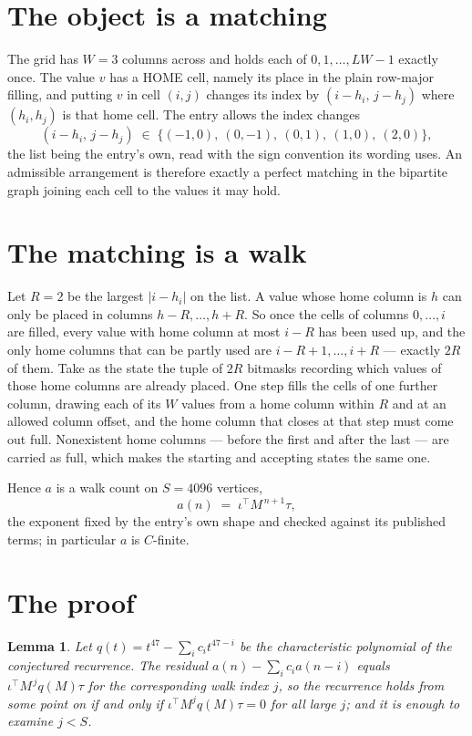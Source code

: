 \documentclass[11pt,a4paper]{article}
\theoremstyle{plain}
\newtheorem{lemma}[theorem]{Lemma}
\theoremstyle{definition}
\begin{document}
\section{The object is a matching}

The grid has $W=3$ columns across and holds each of $0,1,\dots,LW-1$ exactly once. The value
$v$ has a HOME cell, namely its place in the plain row-major filling, and putting $v$ in cell
$(i,j)$ changes its index by $(i-h_i,\,j-h_j)$ where $(h_i,h_j)$ is that home cell. The entry
allows the index changes
\[
(i-h_i,\,j-h_j)\;\in\;\{(-1,0),\ (0,-1),\ (0,1),\ (1,0),\ (2,0)\},
\]
the list being the entry's own, read with the sign convention its wording uses. An admissible
arrangement is therefore exactly a perfect matching in the bipartite graph joining each cell to
the values it may hold.

\section{The matching is a walk}

Let $R=2$ be the largest $|i-h_i|$ on the list. A value whose home column is $h$ can only be
placed in columns $h-R,\dots,h+R$. So once the cells of columns $0,\dots,i$ are filled, every
value with home column at most $i-R$ has been used up, and the only home columns that can be
partly used are $i-R+1,\dots,i+R$ --- exactly $2R$ of them. Take as the state the tuple of
$2R$ bitmasks recording which values of those home columns are already placed. One step fills
the cells of one further column, drawing each of its $W$ values from a home column within $R$
and at an allowed column offset, and the home column that closes at that step must come out
full. Nonexistent home columns --- before the first and after the last --- are carried as
full, which makes the starting and accepting states the same one.

Hence $a$ is a walk count on $S=4096$ vertices,
\[
a(n)\;=\;\iota^{\!\top}M^{\,n+1}\tau ,
\]
the exponent fixed by the entry's own shape and checked against its published terms; in
particular $a$ is $C$-finite.

\section{The proof}

\begin{lemma}\label{lem:crit}
Let $q(t)=t^{47}-\sum_i c_it^{47-i}$ be the characteristic polynomial of the
conjectured recurrence. The residual $a(n)-\sum_ic_ia(n-i)$ equals
$\iota^{\!\top}M^{\,j}q(M)\tau$ for the corresponding walk index $j$, so the recurrence
holds from some point on if and only if $\iota^{\!\top}M^{j}q(M)\tau=0$ for all large $j$;
and it is enough to examine $j<S$.
\end{lemma}
\end{document}
